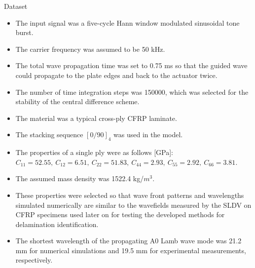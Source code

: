 \documentclass[10pt,aspectratio=169,dvipsnames]{beamer} %
\begin{document}
	\begin{frame}{Dataset}
		\footnotesize	
		\begin{itemize}
			\item The input signal was a five-cycle Hann window modulated sinusoidal tone burst. 
			\item The carrier frequency was assumed to be 50 kHz. 
			\item The total wave propagation time was set to 0.75 ms so that the guided wave could propagate to the plate edges and back to the actuator twice. 
			\item The number of time integration steps was 150000, which was selected for the stability of the central difference scheme.
			\item The material was a typical cross-ply CFRP laminate. 
			\item The stacking sequence \([0/90]_4\) was used in the model. 
			\item The properties of a single ply were as follows [GPa]: \(C_{11}=52.55,\ C_{12}=6.51,\ C_{22}=51.83,\ C_{44}=2.93,\ C_{55}=2.92,\ C_{66}=3.81\). 
			\item The assumed mass density was 1522.4 kg/\(m^3\). 
			\item These properties were selected so that wave front patterns and wavelengths simulated numerically are similar to the wavefields measured by the SLDV on CFRP specimens used later on for testing the developed methods for delamination identification. 
			\item The shortest wavelength of the propagating A0 Lamb wave mode was 21.2 mm for numerical simulations and 19.5 mm for experimental measurements, respectively.
		\end{itemize}		
	\end{frame}
\end{document}
